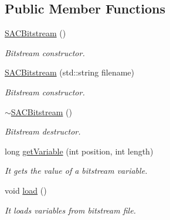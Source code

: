 \subsection*{Public Member Functions}
\begin{DoxyCompactItemize}
\item 
\mbox{\label{class_s_a_c_bitstream_ac9a2c174ea2d49d0804dc33e75690984}} 
\hyperlink{class_s_a_c_bitstream_ac9a2c174ea2d49d0804dc33e75690984}{S\+A\+C\+Bitstream} ()
\begin{DoxyCompactList}\small\item\em Bitstream constructor. \end{DoxyCompactList}\item 
\mbox{\label{class_s_a_c_bitstream_a46fe059e932c2e72d07b4dbf982e6533}} 
\hyperlink{class_s_a_c_bitstream_a46fe059e932c2e72d07b4dbf982e6533}{S\+A\+C\+Bitstream} (std\+::string filename)
\begin{DoxyCompactList}\small\item\em Bitstream constructor. \end{DoxyCompactList}\item 
\mbox{\label{class_s_a_c_bitstream_a4a416e485fb3a14a7bafb0a5542d7945}} 
\hyperlink{class_s_a_c_bitstream_a4a416e485fb3a14a7bafb0a5542d7945}{$\sim$\+S\+A\+C\+Bitstream} ()
\begin{DoxyCompactList}\small\item\em Bitstream destructor. \end{DoxyCompactList}\item 
long \hyperlink{class_s_a_c_bitstream_ad0f39852ca2853efa15be087ce68c3b9}{get\+Variable} (int position, int length)
\begin{DoxyCompactList}\small\item\em It gets the value of a bitstream variable. \end{DoxyCompactList}\item 
\mbox{\label{class_s_a_c_bitstream_a3113cb4df7e64416b156c4f1d9564a4e}} 
void \hyperlink{class_s_a_c_bitstream_a3113cb4df7e64416b156c4f1d9564a4e}{load} ()
\begin{DoxyCompactList}\small\item\em It loads variables from bitstream file. \end{DoxyCompactList}\end{DoxyCompactItemize}
